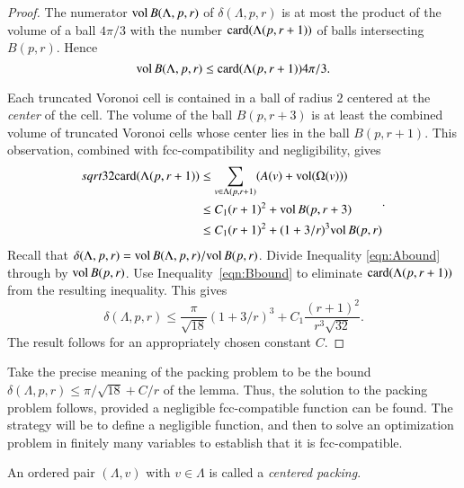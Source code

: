 \begin{proof}
The numerator ${\operatorname{vol}}\, B(\Lambda,p,r)$ of $\delta(\Lambda,p,r)$
is at most the product of the volume of a ball $4\pi/3$ with the
number ${\operatorname{card}}(\Lambda(p,r+1))$ of balls intersecting $B(p,r)$.  Hence
    \begin{equation}
    {\operatorname{vol}}\, B(\Lambda,p,r) \le {\operatorname{card}}(\Lambda(p,r+1)) 4\pi/3.
    \label{eqn:Abound}
    \end{equation}

Each truncated Voronoi cell is contained in a ball of
radius $2$ centered at the {\it center} of the cell.  The volume
of the ball $B(p,r+3)$ is at least the combined volume of 
truncated Voronoi
cells whose center lies in the ball $B(p,r+1)$. This observation,
combined with fcc-compatibility and negligibility, gives
    \begin{equation}
    \begin{split}
    sqrt{32}{\operatorname{card}}(\Lambda(p,r+1))
    &\le \sum_{v\in\Lambda(p,r+1)} (A(v) +
    {\operatorname{vol}}(\Omega(v))) \\
    &\le C_1 (r+1)^2 + {\operatorname{vol}}\,B(p,r+3) \\
    &\le C_1 (r+1)^2 + (1+3/r)^3 {\operatorname{vol}}\,B(p,r)
    \label{eqn:Bbound}
    \end{split}.
    \end{equation}
Recall that $\delta(\Lambda,p,r)=
{\operatorname{vol}}\,B(\Lambda,p,r)/{\operatorname{vol}}\,B(p,r)$. Divide Inequality
\ref{eqn:Abound} through by ${\operatorname{vol}}\,B(p,r)$.  Use
Inequality~\ref{eqn:Bbound} to eliminate ${\operatorname{card}}(\Lambda(p,r+1))$ from the
resulting inequality.  This gives
    $$\delta(\Lambda,p,r)
        \le \frac{\pi}{\sqrt{18}} (1+3/r)^3 + C_1 \frac{(r+1)^2}{r^3\sqrt{32}}.
    $$
The result follows for an appropriately chosen constant $C$.
\end{proof}

\begin{remark} \label{remark:precise}
Take the precise meaning of the packing problem to be the
bound $\delta(\Lambda,p,r) \le \pi/\sqrt{18} + C/r$ of the lemma.
Thus, the solution to the packing problem follows, provided a negligible
fcc-compatible function can be found. The strategy will be to
define a negligible function, and then to solve an optimization
problem in finitely many variables to establish that it is
fcc-compatible.
\end{remark}

An ordered pair $(\Lambda,v)$ with $v\in\Lambda$ is called a {\it centered packing}.


